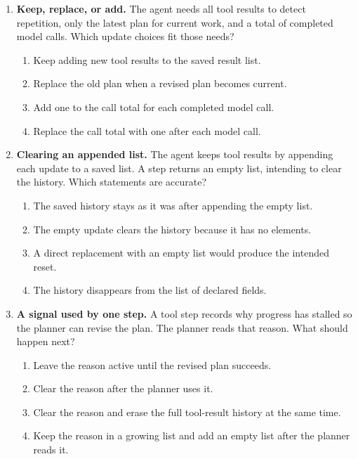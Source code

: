 \begin{enumerate}[start=11,itemsep=0.7\baselineskip]
\item\label{exercise:14} \begin{minipage}[t]{\linewidth}
\textbf{Keep, replace, or add.} The agent needs all tool results to detect repetition, only the latest plan for current work, and a total of completed model calls. Which update choices fit those needs?
\begin{enumerate}[label=\textnormal{(\Alph*)},leftmargin=*,itemsep=0pt]
\item Keep adding new tool results to the saved result list.
\item Replace the old plan when a revised plan becomes current.
\item Add one to the call total for each completed model call.
\item Replace the call total with one after each model call.
\end{enumerate}
\end{minipage}

\item\label{exercise:15} \begin{minipage}[t]{\linewidth}
\textbf{Clearing an appended list.} The agent keeps tool results by appending each update to a saved list. A step returns an empty list, intending to clear the history. Which statements are accurate?
\begin{enumerate}[label=\textnormal{(\Alph*)},leftmargin=*,itemsep=0pt]
\item The saved history stays as it was after appending the empty list.
\item The empty update clears the history because it has no elements.
\item A direct replacement with an empty list would produce the intended reset.
\item The history disappears from the list of declared fields.
\end{enumerate}
\end{minipage}

\item\label{exercise:16} \begin{minipage}[t]{\linewidth}
\textbf{A signal used by one step.} A tool step records why progress has stalled so the planner can revise the plan. The planner reads that reason. What should happen next?
\begin{enumerate}[label=\textnormal{(\Alph*)},leftmargin=*,itemsep=0pt]
\item Leave the reason active until the revised plan succeeds.
\item Clear the reason after the planner uses it.
\item Clear the reason and erase the full tool-result history at the same time.
\item Keep the reason in a growing list and add an empty list after the planner reads it.
\end{enumerate}
\end{minipage}


\end{enumerate}
